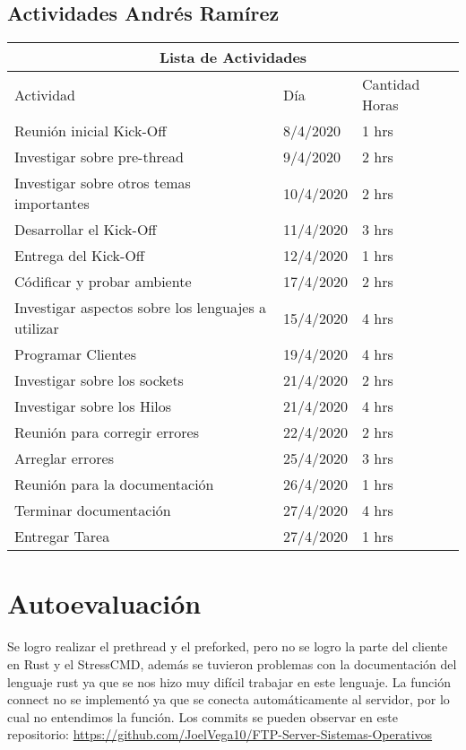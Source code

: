 \documentclass[a4paper,12pt,twoside]{article}
\begin{document}
\subsection{Actividades Andrés Ramírez}

\begin{tabular}{ |p{7cm}||p{3cm}|p{3cm}|  }
 \hline
 \multicolumn{3}{|c|}{Lista de Actividades} \\
 \hline
 Actividad        & Día   &Cantidad Horas\\
 \hline
Reunión inicial Kick-Off   &8/4/2020     &1 hrs\\
Investigar sobre pre-thread   &9/4/2020     &2 hrs\\
Investigar sobre otros temas importantes   &10/4/2020     &2 hrs\\
Desarrollar el Kick-Off   &11/4/2020     &3 hrs\\
Entrega del Kick-Off    &12/4/2020     &1 hrs\\
 \hline
 Códificar y probar ambiente   &17/4/2020     &2 hrs\\
 Investigar aspectos sobre los lenguajes a utilizar   &15/4/2020     &4 hrs\\
 Programar Clientes   &19/4/2020     &4 hrs\\
 Investigar sobre los sockets   &21/4/2020     &2 hrs\\
 Investigar sobre los Hilos   &21/4/2020     &4 hrs\\
 Reunión para corregir errores    &22/4/2020     &2 hrs\\
 Arreglar errores    &25/4/2020     &3 hrs\\
 Reunión para la documentación   &26/4/2020     &1 hrs\\
 Terminar documentación   &27/4/2020     &4 hrs\\
 Entregar Tarea   &27/4/2020     &1 hrs\\
 \hline
\end{tabular}


\newpage
\section{Autoevaluación}
Se logro realizar el prethread y el preforked, pero no se logro la parte del cliente en Rust y el StressCMD, además se tuvieron problemas con la documentación del lenguaje rust ya que se nos hizo muy difícil trabajar en este lenguaje. La función connect no se implementó ya que se conecta automáticamente al servidor, por lo cual no entendimos la función. Los commits se pueden observar en este repositorio:
\url{https://github.com/JoelVega10/FTP-Server-Sistemas-Operativos}
\end{document}
